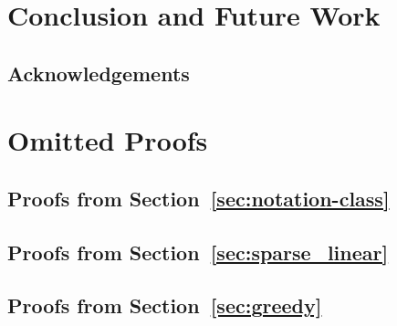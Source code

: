 \documentclass[11pt]{article}
\begin{document}
\section{Conclusion and Future Work}
\label{sec:conclusion}


\subsection*{Acknowledgements} 




\newpage
\appendix

\section{Omitted Proofs}

\subsection{Proofs from Section~\ref{sec:notation-class}}
\label{app:notation-class}


\subsection{Proofs from Section~\ref{sec:sparse_linear}}
\label{app:sparse_linear}


\subsection{Proofs from Section~\ref{sec:greedy}}
\label{app:greedy}

\end{document}
